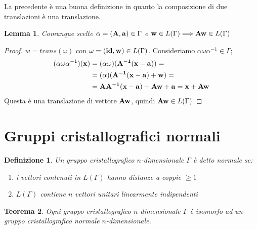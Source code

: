 \documentclass[a4paper,11pt,openright,twoside	]{book}
\newtheorem{definition}{Definizione}[section]
\newtheorem{theorem}{Teorema}[section]
\newtheorem{lemma}[theorem]{Lemma}
\begin{document}
La precedente è una buona definizione in quanto la composizione di due translazioni è una translazione. 

\begin{lemma}
\label{lemma:aw}
Comunque scelte $\alpha = (\vb{A, a}) \in \Gamma$ e $\vb{w} \in L(\Gamma) \Longrightarrow \vb{Aw} \in L(\Gamma)$ 
\end{lemma}

\begin{proof}
$w = trans(\omega)$ con $\omega = (\vb{id, w}	) \in L(\Gamma)$. 
Consideriamo $\alpha \omega \alpha^{-1} \in \Gamma$; 
\[ \begin{split}
( \alpha \omega \alpha^{-1} )(\vb{x}) & = ( \alpha \omega)(\vb{A^{-1}(x-a)}) = \\
& =  ( \alpha  )(\vb{A^{-1}(x-a)} + \vb{w}) = \\
& = \vb{AA^{-1}(x-a)} + \vb{Aw} + \vb{a} = \vb{x} + \vb{Aw} 
\end{split}\] 
Questa è una translazione di vettore $\vb{Aw}$, quindi $\vb{Aw} \in L(\Gamma)$
\end{proof}


\section{Gruppi cristallografici normali}

\begin{definition}
Un gruppo cristallografico $n$-dimensionale $\Gamma$ è detto normale se:
\begin{enumerate}
\item i vettori contenuti in $L(\Gamma)$ hanno distanze a coppie $\geq 1$
\item $L(\Gamma)$ contiene $n$ vettori unitari linearmente indipendenti
\end{enumerate}
\end{definition}


\begin{theorem}
\label{teo:grupnorm}
Ogni gruppo cristallografico $n$-dimensionale $\Gamma$ è isomorfo ad un gruppo cristallografico normale $n$-dimensionale.
\end{theorem}
\end{document}
